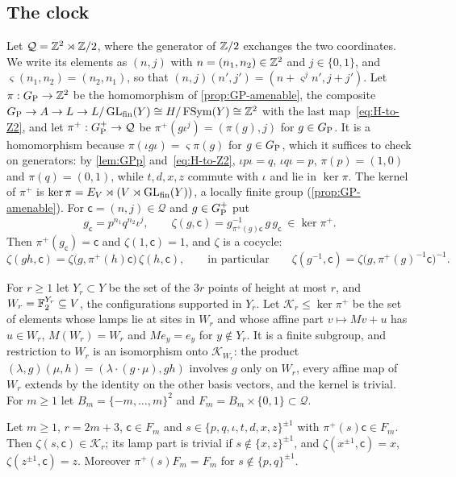 \subsection{The clock}\label{sec:upper-clock}

Let $\mathcal Q=\mathbb Z^2\rtimes\mathbb Z/2$, where the generator of $\mathbb Z/2$ exchanges the two coordinates. We write its elements as $(n,j)$ with
$n=(n_1,n_2)\in\mathbb Z^2$ and $j\in\{0,1\}$, and $\varsigma(n_1,n_2)=(n_2,n_1)$, so that $(n,j)(n',j')=(n+\varsigma^jn',j+j')$. Let $\pi:G_{\mathrm P}\to\mathbb Z^2$ be the homomorphism of \cref{prop:GP-amenable}, the composite $G_{\mathrm P}\to A\to L\to
L/\operatorname{GL}_{\rm fin}(Y)\cong H/\operatorname{FSym}(Y)\cong\mathbb Z^2$ with the last map~\eqref{eq:H-to-Z2}, and let $\pi^+:G_{\mathrm P}^{+}\to\mathcal Q$ be
$\pi^+(g\iota^j)=(\pi(g),j)$ for $g\in G_{\mathrm P}$. It is a homomorphism because $\pi(\iota g\iota)=\varsigma\pi(g)$ for $g\in G_{\mathrm P}$, which it
suffices to check on generators: by \cref{lem:GPp} and~\eqref{eq:H-to-Z2}, $\iota p\iota=q$, $\iota q\iota=p$, $\pi(p)=(1,0)$ and
$\pi(q)=(0,1)$, while $t,d,x,z$ commute with $\iota$ and lie in $\ker\pi$. The kernel of $\pi^+$ is $\ker\pi=E_V\rtimes(V\rtimes\operatorname{GL}_{\rm
fin}(Y))$, a locally finite group (\cref{prop:GP-amenable}). For $\mathsf c=(n,j)\in\mathcal Q$ and $g\in G_{\mathrm P}^{+}$ put
\[
g_{\mathsf c}=p^{n_1}q^{n_2}\iota^j,\qquad \zeta(g,\mathsf c)=g_{\pi^+(g)\mathsf c}^{-1}\,g\,g_{\mathsf c}\ \in\ker\pi^+ .
\]
Then $\pi^+(g_{\mathsf c})=\mathsf c$ and $\zeta(1,\mathsf c)=1$, and $\zeta$ is a cocycle:
\begin{equation}\label{eq:cocycle}
\zeta(gh,\mathsf c)=\zeta\bigl(g,\pi^+(h)\mathsf c\bigr)\,\zeta(h,\mathsf c),\qquad\text{in particular}\qquad\zeta(g^{-1},\mathsf c)=\zeta\bigl(g,\pi^+(g)^{-1}\mathsf c\bigr)^{-1}.
\end{equation}

For $r\ge1$ let $Y_r\subset Y$ be the set of the $3r$ points of height at most $r$, and $W_r=\mathbb F_2^{Y_r}\subseteq V$, the configurations
supported in $Y_r$. Let $\mathcal K_r\le\ker\pi^+$ be the set of elements whose lamps lie at sites in $W_r$ and whose affine part
$v\mapsto Mv+u$ has $u\in W_r$, $M(W_r)=W_r$ and $Me_y=e_y$ for $y\notin Y_r$. It is a finite subgroup, and restriction to $W_r$ is an
isomorphism onto $\mathcal K_{W_r}$: the product $(\lambda,g)(\mu,h)=(\lambda\cdot(g\cdot\mu),gh)$ involves $g$ only on $W_r$, every affine
map of $W_r$ extends by the identity on the other basis vectors, and the kernel is trivial. For $m\ge1$ let $B_m=\{-m,\dots,m\}^2$ and
$F_m=B_m\times\{0,1\}\subset\mathcal Q$.

\begin{lemma}\label{lem:clock}
Let $m\ge1$, $r=2m+3$, $\mathsf c\in F_m$ and $s\in\{p,q,\iota,t,d,x,z\}^{\pm1}$ with $\pi^+(s)\mathsf c\in F_m$. Then $\zeta(s,\mathsf c)\in
\mathcal K_r$; its lamp part is trivial if $s\notin\{x,z\}^{\pm1}$, and $\zeta(x^{\pm1},\mathsf c)=x$, $\zeta(z^{\pm1},\mathsf c)=z$.
Moreover $\pi^+(s)F_m=F_m$ for $s\notin\{p,q\}^{\pm1}$.
\end{lemma}

